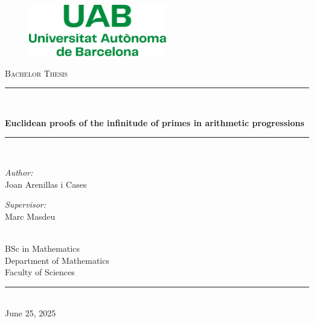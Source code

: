 \documentclass[12pt, twoside]{article}
\renewcommand\title{Euclidean proofs of the infinitude of primes in arithmetic progressions}
\renewcommand\author{Joan Arenillas i Cases}
\renewcommand\date{June 25, 2025}
\newcommand\supervisor{Marc Masdeu}
\newcommand\faculty{Faculty of Sciences}
\newcommand\department{Department of Mathematics}
\newcommand\unidegree{BSc in Mathematics}
\begin{document}
\begin{titlepage}
  \begin{center}
    \vspace*{0.4in}
    \begin{figure}[H]
      \begin{center}
        \includegraphics[width=6cm]{Images/UABVectoritzat_v2.pdf}
      \end{center}
    \end{figure}
    \vspace*{1.5cm}
    \textsc{\Large Bachelor Thesis}\\[0.75cm]
    \rule{157mm}{0.1mm}\\[0.4cm]
    {\huge \bfseries \title\par}
    \vspace{0.4cm} %
    \rule{157mm}{0.1mm} \\[1.5cm] %
    \begin{minipage}[ht]{0.4\textwidth}
      \begin{flushleft} \large
        \emph{Author:}\\[0.2cm]
        \author %
      \end{flushleft}
    \end{minipage}
    \begin{minipage}[ht]{0.4\textwidth}
      \begin{flushright} \large
        \emph{Supervisor:} \\[0.2cm]
        \supervisor %
      \end{flushright}
    \end{minipage}\\[3cm]
    \vfill
    {\large
      \unidegree\\[0.2cm]
      \department\\[0.2cm]
      \faculty\\[0.5cm]
    }
    \rule{80mm}{0.1mm}\\[0.5cm]
    {\large \date}\\[0.2cm]
    \vfill
  \end{center}
  \newpage
\end{titlepage}
\thispagestyle{empty}
\cleardoublepage
\end{document}
